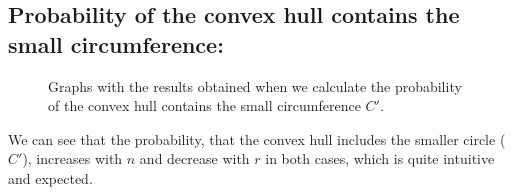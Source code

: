 \documentclass[12pt,a4paper]{article}
\begin{document}
\subsection{Probability of the convex hull contains the small circumference:}
\begin{figure}[H]
 \centering
 \caption{Graphs with the results obtained when we calculate the probability of the convex hull contains the small circumference $C'$.}
 \label{f:results_prob}
\end{figure}

We can see that the probability, that the convex hull includes the smaller circle ($C'$), increases with $n$ and decrease with $r$ in both cases, which is quite intuitive and expected.
\end{document}
